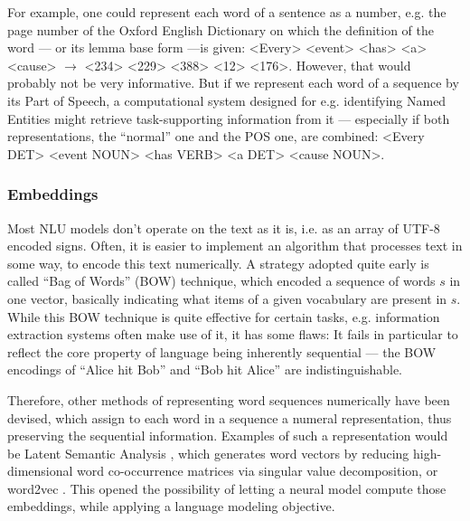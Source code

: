For example, one could represent each word of a sentence as a number, e.g. the page number
of the Oxford English Dictionary on which the definition of the word --- or its lemma base
form ---is given: <Every> <event> <has> <a> <cause> $\rightarrow$ <234> <229> <388> <12>
<176>. However, that would probably not be very informative. But if we represent each word
of a sequence by its Part of Speech, a computational system designed for e.g. identifying
Named Entities might retrieve task-supporting information from it --- especially if both
representations, the ``normal'' one and the POS one, are combined: <Every DET> <event NOUN>
<has VERB> <a DET> <cause NOUN>.


\subsubsection*{Embeddings}


Most NLU models don't operate on the text as it is, i.e. as an array of UTF-8 encoded
signs. Often, it is easier to implement an algorithm that processes text in some way, to
encode this text numerically. A strategy adopted quite early is called ``Bag of
Words'' (BOW) \citep{harris1954distributional} technique, which encoded a sequence of words $s$
in one vector, basically indicating what items of a given vocabulary are present in $s$.
While this BOW technique is quite effective for certain tasks, e.g. information extraction
systems often make use of it, it has some flaws: It fails in particular to reflect the core
property of language being inherently sequential --- the BOW encodings of ``Alice hit Bob''
and ``Bob hit Alice'' are indistinguishable.

Therefore, other methods of representing word sequences numerically have been devised, which assign
to each word in a sequence a numeral representation, thus preserving the sequential information.
Examples of such a representation would be Latent Semantic Analysis \citep{furnas1988using}, which
generates word vectors by reducing high-dimensional word co-occurrence matrices via singular value
decomposition, or word2vec \citep{mikolov2013distributed}. This opened the possibility of letting a
neural model compute those embeddings, while applying a language modeling objective.


